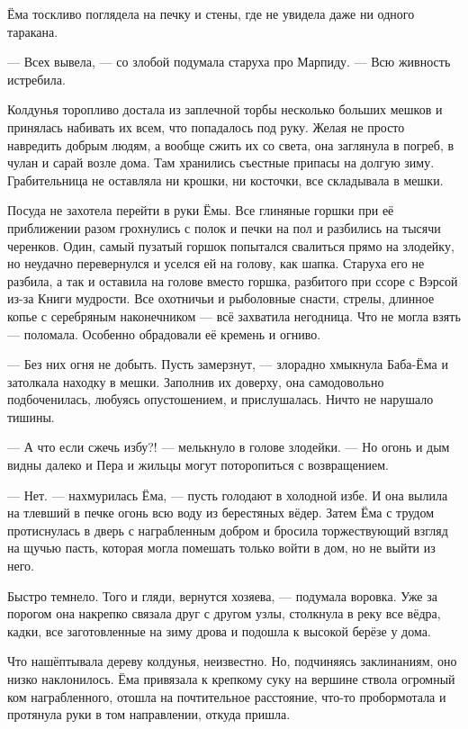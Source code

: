 \documentclass[oneside,final,14pt]{extreport}
\begin{document}
	Ёма тоскливо поглядела на печку и стены, где не увидела даже ни одного таракана.
	
	— Всех вывела, — со злобой подумала старуха про Марпиду. — Всю живность истребила.
	
	Колдунья торопливо достала из заплечной торбы несколько больших мешков и принялась набивать их всем, что попадалось под руку. Желая не просто навредить добрым людям, а вообще сжить их со света, она заглянула в погреб, в чулан и сарай возле дома. Там хранились съестные припасы на долгую зиму. Грабительница не оставляла ни крошки, ни косточки, все складывала в мешки.
	
	Посуда не захотела перейти в руки Ёмы. Все глиняные горшки при её приближении разом грохнулись с полок и печки на пол и разбились на тысячи черенков. Один, самый пузатый горшок попытался свалиться прямо на злодейку, но неудачно перевернулся и уселся ей на голову, как шапка. Старуха его не разбила, а так и оставила на голове вместо горшка, разбитого при ссоре с Вэрсой из-за Книги мудрости. Все охотничьи и рыболовные снасти, стрелы, длинное копье с серебряным наконечником — всё захватила негодница. Что не могла взять — поломала. Особенно обрадовали её кремень и огниво.
	
	— Без них огня не добыть. Пусть замерзнут, — злорадно хмыкнула Баба-Ёма и затолкала находку в мешки. Заполнив их доверху, она самодовольно подбоченилась, любуясь опустошением, и прислушалась. Ничто не нарушало тишины.
	
	— А что если сжечь избу?! — мелькнуло в голове злодейки. — Но огонь и дым видны далеко и Пера и жильцы могут поторопиться с возвращением.
	
	— Нет. — нахмурилась Ёма, — пусть голодают в холодной избе. И она вылила на тлевший в печке огонь всю воду из берестяных вёдер. Затем Ёма с трудом протиснулась в дверь с награбленным добром и бросила торжествующий взгляд на щучью пасть, которая могла помешать только войти в дом, но не выйти из него.
	
	Быстро темнело. Того и гляди, вернутся хозяева, — подумала воровка. Уже за порогом она накрепко связала друг с другом узлы, столкнула в реку все вёдра, кадки, все заготовленные на зиму дрова и подошла к высокой берёзе у дома.
	
	Что нашёптывала дереву колдунья, неизвестно. Но, подчиняясь заклинаниям, оно низко наклонилось. Ёма привязала к крепкому суку на вершине ствола огромный ком награбленного, отошла на почтительное расстояние, что-то пробормотала и протянула руки в том направлении, откуда пришла.
	
\end{document}

